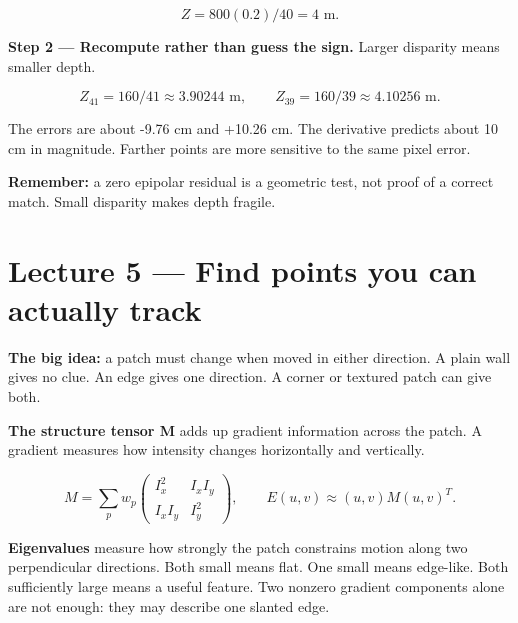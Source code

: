 \documentclass[11pt,letterpaper]{article}
\begin{document}
\begin{tcolorbox}\color{MathBlue}\[Z=800(0.2)/40=4\text{ m}.\]\end{tcolorbox}


\textcolor{StepRed}{\textbf{Step 2 — Recompute rather than guess the sign.} Larger disparity means smaller depth.}



\begin{tcolorbox}\color{MathBlue}\[Z_{41}=160/41\approx3.90244\text{ m},\qquad Z_{39}=160/39\approx4.10256\text{ m}.\]\end{tcolorbox}


The errors are about -9.76 cm and +10.26 cm. The derivative predicts about 10 cm in magnitude. Farther points are more sensitive to the same pixel error.



\textbf{Remember:} a zero epipolar residual is a geometric test, not proof of a correct match. Small disparity makes depth fragile.



\section*{Lecture 5 — Find points you can actually track}


\textbf{The big idea:} a patch must change when moved in either direction. A plain wall gives no clue. An edge gives one direction. A corner or textured patch can give both.



\textbf{The structure tensor M} adds up gradient information across the patch. A gradient measures how intensity changes horizontally and vertically.



\begin{tcolorbox}\color{MathBlue}\[M=\sum_p w_p\begin{pmatrix}I_x^2&I_xI_y\\I_xI_y&I_y^2\end{pmatrix},\qquad E(u,v)\approx(u,v)M(u,v)^T.\]\end{tcolorbox}


\textbf{Eigenvalues} measure how strongly the patch constrains motion along two perpendicular directions. Both small means flat. One small means edge-like. Both sufficiently large means a useful feature. Two nonzero gradient components alone are not enough: they may describe one slanted edge.
\end{document}
